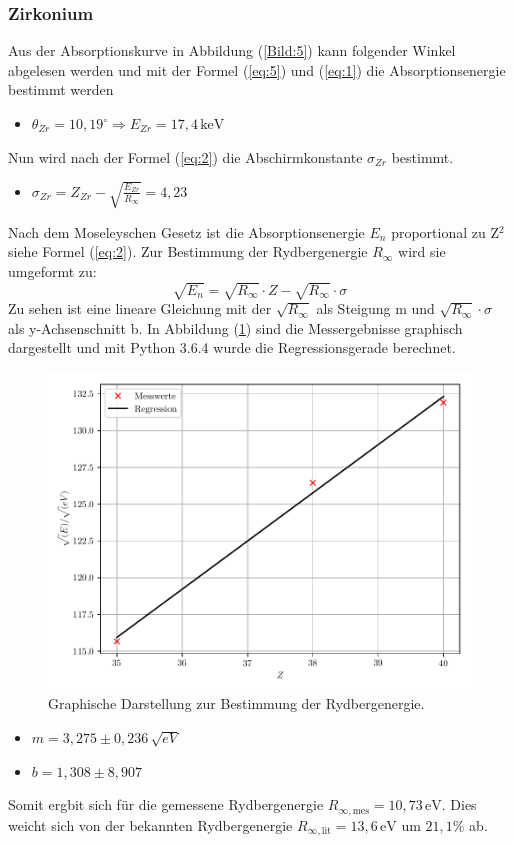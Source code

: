 \subsubsection{Zirkonium}
Aus der Absorptionskurve in Abbildung (\ref{Bild:5}) kann folgender Winkel abgelesen werden und mit der Formel (\ref{eq:5}) und (\ref{eq:1}) die
Absorptionsenergie bestimmt werden
\begin{itemize}
  \item $\theta_{Zr} = 10,19^\circ \Rightarrow E_{Zr} = 17,4 \, \text{keV}$
\end{itemize}
Nun wird nach der Formel (\ref{eq:2}) die Abschirmkonstante $\sigma_{Zr}$ bestimmt.
\begin{itemize}
  \item $\sigma_{Zr} = Z_{Zr} - \sqrt{\frac{E_{Zr}}{R_\infty}} = 4,23$
\end{itemize}

Nach dem Moseleyschen Gesetz ist die Absorptionsenergie $E_n$ proportional zu Z$^2$ siehe Formel (\ref{eq:2}).
Zur Bestimmung der Rydbergenergie $R_\infty$ wird sie umgeformt zu:
\begin{equation*}
  \sqrt{E_n} = \sqrt{R_\infty} \cdot Z - \sqrt{R_\infty} \cdot \sigma
\end{equation*}
Zu sehen ist eine lineare Gleichung mit der $\sqrt{R_\infty}$ als Steigung m und $\sqrt{R_\infty} \cdot \sigma$ als
y-Achsenschnitt b.
In Abbildung (\ref{abb:3}) sind die Messergebnisse graphisch dargestellt und mit Python 3.6.4 wurde
die Regressionsgerade berechnet.
\begin{figure}[H]
  \centering
  \includegraphics[width=\textwidth]{plot1.pdf}
  \caption{Graphische Darstellung zur Bestimmung der Rydbergenergie.}
  \label{abb:3}
\end{figure}
\begin{itemize}
  \item $m =  3,275 \pm 0,236 \, \text{$\sqrt{eV}$}$
  \item $b =  1,308 \pm 8,907$
\end{itemize}
Somit ergbit sich für die gemessene Rydbergenergie $R_{\infty,\text{mes}} = 10,73 \, \text{eV}$.
Dies weicht sich von der bekannten Rydbergenergie $R_{\infty, \text{lit}} = 13,6 \, \text{eV}$
um $21,1 \%$ ab.


